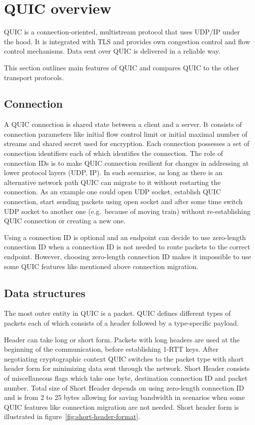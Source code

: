

\chapter{QUIC overview}
\label{ch:quic-overview}
QUIC is a connection-oriented, multistream protocol that uses UDP/IP under the hood.
It is integrated with TLS and provides own congestion control and flow control mechanisms.
Data sent over QUIC is delivered in a reliable way.

This section outlines main features of QUIC and compares QUIC to the other transport protocols.


\section{Connection}
\label{sec:connection}
A QUIC connection is shared state between a client and a server.
It consists of connection parameters like initial flow control limit or initial maximal number of streams and
shared secret used for encryption.
Each connection possesses a set of connection identifiers each of which identifies the connection.
The role of connection IDs is to make QUIC connection resilient for changes in addressing at lower protocol layers (UDP, IP).
In such scenarios, as long as there is an alternative network path QUIC can migrate to it without restarting the connection.
As an example one could open UDP socket, establish QUIC connection, start sending packets using open socket and after some time
switch UDP socket to another one (e.g.\ because of moving train) without re-establishing QUIC connection or creating a new one.

Using a connection ID is optional and an endpoint can decide to use zero-length connection ID when a connection ID is not needed to route packets to the correct endpoint.
However, choosing zero-length connection ID makes it impossible to use some QUIC features like mentioned above
connection migration.


\section{Data structures}
\label{sec:quic-data-structures}
The most outer entity in QUIC is a packet.
QUIC defines different types of packets each of which consists of a header followed by a type-specific payload.

Header can take long or short form.
Packets with long headers are used at the beginning of the communication, before establishing 1-RTT keys.
After negotiating cryptographic context QUIC switches to the packet type with short header form for minimizing data sent
through the network.
Short Header consists of miscellaneous flags which take one byte, destination connection ID and packet number.
Total size of Short Header depends on using zero-length connection ID and is from 2 to 25 bytes allowing for saving
bandwidth in scenarios when some QUIC features like connection migration are not needed.
Short header form is illustrated in figure~\ref{fig:short-header-format}.

